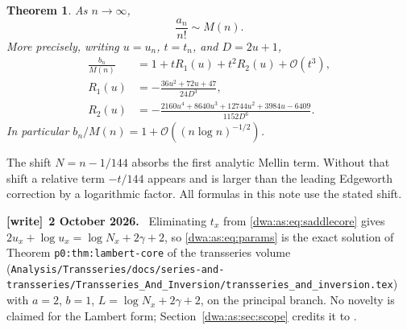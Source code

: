 \documentclass[11pt,letterpaper]{article}
\newcommand{\file}[1]{\nolinkurl{#1}}
\numberwithin{equation}{section}
\newtheorem{theorem}{Theorem}[section]
\theoremstyle{remark}
\newcommand{\OO}{\mathcal O}
\newenvironment{writenote}[1][]{\par\smallskip\begingroup\small
 \noindent\textbf{[write]}\if\relax\detokenize{#1}\relax\else~\textbf{#1.}\fi\ }%
 {\par\endgroup\smallskip}
\begin{document}
\begin{theorem}\label{dwa:as:thm:main}
As $n\to\infty$,
\begin{equation}\label{dwa:as:eq:equiv}
 \frac{a_n}{n!}\sim M(n).
\end{equation}
More precisely, writing $u=u_n$, $t=t_n$, and $D=2u+1$,
\begin{align}
 \frac{b_n}{M(n)}
 &=1+tR_1(u)+t^2R_2(u)+\OO(t^3),\label{dwa:as:eq:two}\\
 R_1(u)&=-\frac{36u^2+72u+47}{24D^3},\label{dwa:as:eq:r1}\\
 R_2(u)&=-\frac{2160u^4+8640u^3+12744u^2+3984u-6409}{1152D^6}.
 \label{dwa:as:eq:r2}
\end{align}
In particular $b_n/M(n)=1+\OO((n\log n)^{-1/2})$.
\end{theorem}
The shift $N=n-1/144$ absorbs the first analytic Mellin term. Without that shift a relative term $-t/144$ appears and is larger than the leading Edgeworth correction by a logarithmic factor. All formulas in this note use the stated shift.
\begin{writenote}[2 October 2026]
Eliminating $t_x$ from \eqref{dwa:as:eq:saddlecore} gives $2u_x+\log u_x=\log N_x+2\gamma+2$, so \eqref{dwa:as:eq:params} is the exact solution of Theorem \texttt{p0:thm:lambert-core} of the transseries volume (\file{Analysis/Transseries/docs/series-and-transseries/}\allowbreak\file{Transseries_And_Inversion/transseries_and_inversion.tex}) with $a=2$, $b=1$, $L=\log N_x+2\gamma+2$, on the principal branch. No novelty is claimed for the Lambert form; Section~\ref{dwa:as:sec:scope} credits it to \cite{BW}.
\end{writenote}
\end{document}
